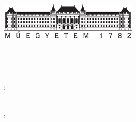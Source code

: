 \begin{titlepage}
  \begin{center}  
  \includegraphics[width=7cm]{./figures/bme_logo.pdf}
  \vspace{0.3cm}
  
  \bme \\
  \vik \\
  \viktanszek \\
  \vspace{5cm}
  
  \huge {\vikcim}
  \vspace{1.5cm}
  
  \large {\textbf{\tdk}}
  \vfill
    
  {\Large 
  	\keszitette: \\ \vspace{0.3cm}
  	\szerzo \\
	\tdkszerzoB \\
  	\vspace{1.5cm}
  	\konzulens: \\ \vspace{0.3cm}
  	\vikkonzulensA \\
  	\vikkonzulensB \\
  }
  
  \vspace{2cm}
  \large {\tdkev}
 \end{center}
\end{titlepage}
